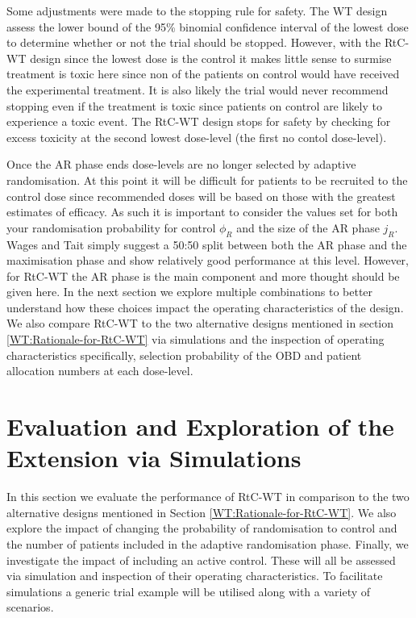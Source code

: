 Some adjustments were made to the stopping rule for safety. The WT design assess the lower bound of the 95\% binomial confidence interval of the lowest dose to determine whether or not the trial should be stopped. However, with the RtC-WT design since the lowest dose is the control it makes little sense to surmise treatment is toxic here since non of the patients on control would have received the experimental treatment. It is also likely the trial would never recommend stopping even if the treatment is toxic since patients on control are likely to experience a toxic event. The RtC-WT design stops for safety by checking for excess toxicity at the second lowest dose-level (the first no contol dose-level). 

Once the AR phase ends dose-levels are no longer selected by adaptive randomisation. At this point it will be difficult for patients to be recruited to the control dose since recommended doses will be based on those with the greatest estimates of efficacy. As such it is important to consider the values set for both your randomisation probability for control $\phi_R$ and the size of the AR phase $j_R$. Wages and Tait simply suggest a 50:50 split between both the AR phase and the maximisation phase and show relatively good performance at this level. However, for RtC-WT the AR phase is the main component and more thought should be given here. In the next section we explore multiple combinations to better understand how these choices impact the operating characteristics of the design. We also compare RtC-WT to the two alternative designs mentioned in section  \ref{WT:Rationale-for-RtC-WT} via simulations and the inspection of operating characteristics specifically, selection probability of the OBD and patient allocation numbers at each dose-level. 
 
 
 \section{Evaluation and Exploration of the Extension via Simulations}
 \label{WT:Evaluation-of-the-Extension}
 
 In this section we evaluate the performance of RtC-WT in comparison to the two alternative designs mentioned in Section \ref{WT:Rationale-for-RtC-WT}. We also explore the impact of changing the probability of randomisation to control and the number of patients included in the adaptive randomisation phase. Finally, we investigate the impact of including an active control. These will all be assessed via simulation and inspection of their operating characteristics. To facilitate simulations a generic trial example will be utilised along with a variety of scenarios. 
 
